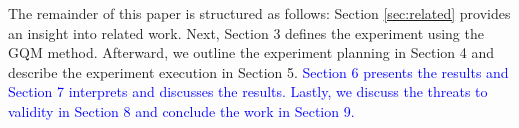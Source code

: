 The remainder of this paper is structured as follows: Section \ref{sec:related} provides an insight into related work. Next, Section 3 defines the experiment using the GQM method. Afterward, we outline the experiment planning in Section 4 and describe the experiment execution in Section 5. \textcolor{blue}{Section 6 presents the results and Section 7 interprets and discusses the results. Lastly, we discuss the threats to validity in Section 8 and conclude the work in Section 9.}

